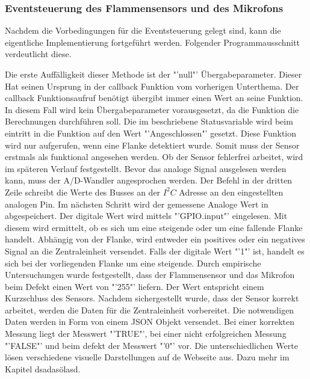 \subsubsection*{Eventsteuerung des Flammensensors und des Mikrofons}
	Nachdem die Vorbedingungen für die Eventsteuerung gelegt sind, kann die eigentliche Implementierung fortgeführt werden. Folgender Programmausschnitt verdeutlicht diese.
	
	Die erste Auffälligkeit dieser Methode ist der "'null"' Übergabeparameter. Dieser Hat seinen Ursprung in der callback Funktion vom vorherigen Unterthema. Der callback Funktionsaufruf benötigt übergibt immer einen Wert an seine Funktion. In diesem Fall wird kein Übergabeparameter vorausgesetzt, da die Funktion die Berechnungen durchführen soll. Die im  beschriebene Statusvariable wird beim eintritt in die Funktion auf den Wert "'Angeschlossen"' gesetzt. Diese Funktion wird nur aufgerufen, wenn eine Flanke detektiert wurde. Somit muss der Sensor erstmals als funktional angesehen werden. Ob der Sensor fehlerfrei arbeitet, wird im späteren Verlauf festgestellt. Bevor das analoge Signal ausgelesen werden kann, muss der \ac{A/D-Wandler} angesprochen werden. Der Befehl in der dritten Zeile schreibt die Werte des Busses an der $I^2C$ Adresse an den eingestellten analogen Pin. Im nächsten Schritt wird der gemessene Analoge Wert in abgespeichert. Der digitale Wert wird mittels "'GPIO.input"' eingelesen. Mit diesem wird ermittelt, ob es sich um eine steigende oder um eine fallende Flanke handelt. Abhängig von der Flanke, wird entweder ein positives oder ein negatives Signal an die Zentraleinheit versendet. Falls der digitale Wert "'1"' ist, handelt es sich bei der vorliegenden Flanke um eine steigende. Durch empirische Untersuchungen wurde festgestellt, dass der Flammensensor und das Mikrofon beim Defekt einen Wert von "'255"' liefern. Der Wert entspricht einem Kurzschluss des Sensors. Nachdem sichergestellt wurde, dass der Sensor korrekt arbeitet, werden die Daten für die Zentraleinheit vorbereitet. Die notwendigen Daten werden in Form von einem \ac{JSON} Objekt versendet. Bei einer korrekten Messung liegt der Messwert "'TRUE"', bei einer nicht erfolgreichen Messung "'FALSE"' und beim defekt der Messwert "'0"' vor. Die unterschiedlichen Werte lösen verschiedene visuelle Darstellungen auf de Webseite aus. Dazu mehr im Kapitel
	dsadasölasd.

